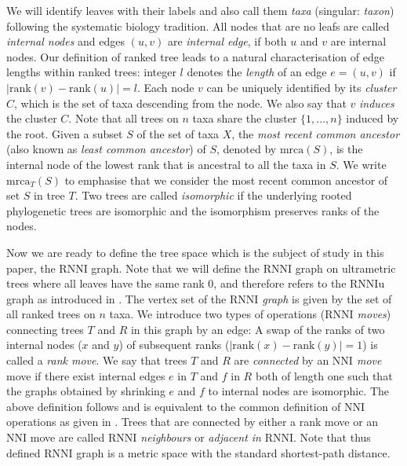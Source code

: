 \documentclass{amsart}
\newcommand{\mrca}{\mathrm{mrca}}
\newcommand{\rank}{\mathrm{rank}}
\newcommand{\nni}{\mathrm{NNI}}
\newcommand{\rnni}{\mathrm{RNNI}}
\newcommand{\rnniu}{\mathrm{RNNIu}}
\begin{document}
We will identify leaves with their labels and also call them \emph{taxa} (singular: \emph{taxon}) following the systematic biology tradition.
All nodes that are no leafs are called \emph{internal nodes} and edges $(u,v)$ are \emph{internal edge}, if both $u$ and $v$ are internal nodes.
Our definition of ranked tree leads to a natural characterisation of edge lengths within ranked trees:
integer $l$ denotes the \emph{length} of an edge $e=(u,v)$ if $|\rank(v) - \rank(u)| = l$.
Each node $v$ can be uniquely identified by its \emph{cluster} $C$, which is the set of taxa descending from the node. 
We also say that $v$ \emph{induces} the cluster $C$.
Note that all trees on $n$ taxa share the cluster $\{1,\ldots,n\}$ induced by the root.
Given a subset $S$ of the set of taxa $X$, the \emph{most recent common ancestor} (also known as \emph{least common ancestor}) of $S$, denoted by $\mrca(S)$, is the internal node of the lowest rank that is ancestral to all the taxa in $S$.
We write $\mrca_T(S)$ to emphasise that we consider the most recent common ancestor of set $S$ in tree $T$.
Two trees are called \emph{isomorphic} if the underlying rooted phylogenetic trees are isomorphic and the isomorphism preserves ranks of the nodes.

Now we are ready to define the tree space which is the subject of study in this paper, the $\rnni$ graph.
Note that we will define the $\rnni$ graph on ultrametric trees where all leaves have the same rank $0$, and therefore refers to the $\rnniu$ graph as introduced in \autocite{Gavryushkin2017}.
The vertex set of the \emph{$\rnni$ graph} is given by the set of all ranked trees on $n$ taxa.
We introduce two types of operations (\emph{$\rnni$ moves}) connecting trees $T$ and $R$ in this graph by an edge:
A swap of the ranks of two internal nodes ($x$ and $y$) of subsequent ranks ($|\rank(x) - \rank(y)| = 1$) is called a \emph{rank move}.
We say that trees $T$ and $R$ are \emph{connected} by an \emph{$\nni$ move} move if there exist internal edges $e$ in $T$ and $f$ in $R$ both of length one such that the graphs obtained by shrinking $e$ and $f$ to internal nodes are isomorphic.
The above definition follows \autocite{Gavryushkin2017} and is equivalent to the common definition of $\nni$ operations as given in \autocite{Steel2016-ye}.
Trees that are connected by either a rank move or an $\nni$ move are called \emph{$\rnni$ neighbours} or \emph{adjacent in} $\rnni$.
Note that thus defined $\rnni$ graph is a metric space with the standard shortest-path distance.
\end{document}
